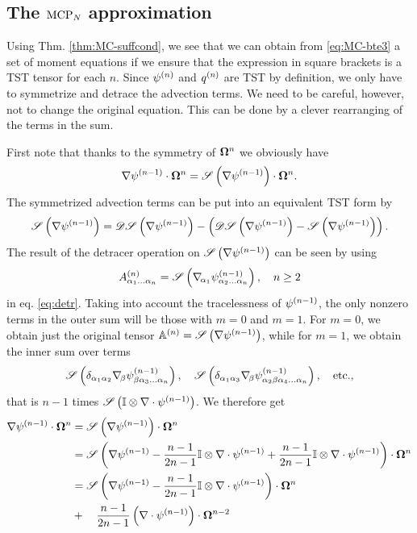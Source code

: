 \subsection{The $\MCPN$ approximation}
Using Thm. \ref{thm:MC-suffcond}, we see that we can obtain from \eqref{eq:MC-bte3} a set of moment equations if we
ensure that the expression in square brackets is a TST tensor for each $n$. Since $\fmom$ and $\qmom$ are TST by
definition, we only have to symmetrize and detrace the advection terms. We need to be careful, however, not to change
the original equation. This can be done by a clever rearranging of the terms in the sum.

First note that thanks to the symmetry of $\bomega^n$ we obviously have $$
  \nabla\fmom[n-1]\contr\bomega^n = \Sym{\nabla\fmom[n-1]}\contr\bomega^n.
$$ The symmetrized advection terms can be put into an equivalent TST form by $$
  \Sym{\nabla\fmom[n-1]} = \detr\Sym{\nabla\fmom[n-1]} - \left(\detr\Sym{\nabla\fmom[n-1]} -
  \Sym{\nabla\fmom[n-1]}\right).
$$ The result of the detracer operation on $\Sym{\nabla\fmom[n-1]}$ can be seen by using $$
  \AAA{\alpha_1\ldots\alpha_n} = \Sym{\gradcomp{\alpha_1}\fmom[n-1]_{\alpha_2\ldots\alpha_n}},\quad n \geq 2
$$ in eq. \eqref{eq:detr}. Taking into account the tracelessness of $\fmom[n-1]$, the only nonzero terms in the outer
sum will be those with $m = 0$ and $m = 1$. For $m = 0$, we obtain just the original tensor $\AA =
\Sym{\nabla\fmom[n-1]}$, while for $m = 1$, we obtain the inner sum over terms
\begin{equation*}
  \Sym{\kron{\alpha_1}{\alpha_2}\gradcomp{\beta}\fmom[n-1]_{\beta\alpha_3\ldots\alpha_n}},\quad
  \Sym{\kron{\alpha_1}{\alpha_3}\gradcomp{\beta}\fmom[n-1]_{\alpha_2\beta\alpha_4\ldots\alpha_n}},\quad\mbox{etc.},
\end{equation*}
that is $n-1$ times $\Sym{\eye\otimes\nabla\cdot\fmom[n-1]}$. We therefore get
\begin{equation}
\begin{aligned}\label{eq:MC-split0}
  \nabla\fmom[n-1]\contr\bomega^n &= \Sym{\nabla\fmom[n-1]}\contr\bomega^n\\
    & = \Sym{\nabla\fmom[n-1] - \frac{n-1}{2n-1}\eye\otimes\nabla\cdot\fmom[n-1] + \frac{n-1}{2n-1}\eye\otimes\nabla\cdot\fmom[n-1]}\contr\bomega^n\\
    & = \Sym{\nabla\fmom[n-1] - \frac{n-1}{2n-1}\eye\otimes\nabla\cdot\fmom[n-1]}\contr\bomega^n \\
    & +\quad \frac{n-1}{2n-1}\left(\nabla\cdot\fmom[n-1]\right)\contr\bomega^{n-2}
\end{aligned}
\end{equation}

